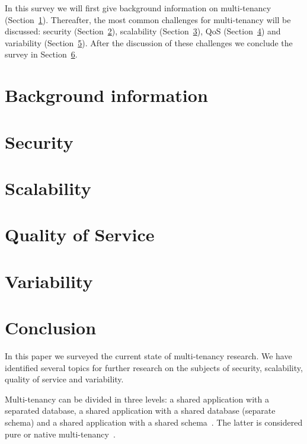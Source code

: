 \documentclass{article}
\begin{document}
In this survey we will first give background information on multi-tenancy (Section~\ref{sec:bg}). Thereafter, the most common challenges for multi-tenancy will be discussed: security (Section~\ref{sec:security}), scalability (Section~\ref{sec:scalability}), \ac{QoS} (Section~\ref{sec:qos}) and variability (Section~\ref{sec:variability}). After the discussion of these challenges we conclude the survey in Section~\ref{sec:conclusion}.

\section{Background information}
\label{sec:bg}


\section{Security}
\label{sec:security}


\section{Scalability}
\label{sec:scalability}


\section{Quality of Service}
\label{sec:qos}


\section{Variability}
\label{sec:variability}


\section{Conclusion}
\label{sec:conclusion}
In this paper we surveyed the current state of multi-tenancy research.
We have identified several topics for further research on the subjects of security, scalability, quality of service and variability.

Multi-tenancy can be divided in three levels: a shared application with a separated database, a shared application with a shared database (separate schema) and a shared application with a shared schema~\cite{bezemer2010multi}. The latter is considered pure or native multi-tenancy~\cite{bezemer2010multi,lin2009feedback,aulbach2009comparison}.
\end{document}
